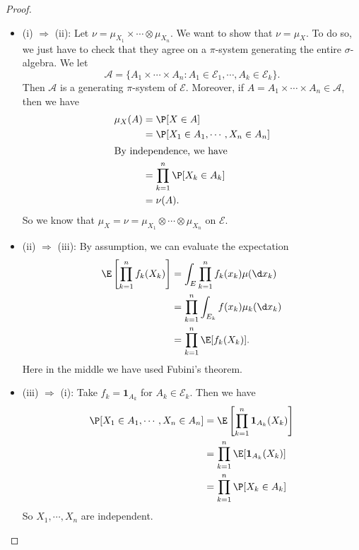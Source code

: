 \documentclass[a4paper]{article}
\begin{document}
\begin{proof}\leavevmode
  \begin{itemize}
    \item (i) $\Rightarrow$ (ii): Let $\nu = \mu_{X_1} \times \cdots \otimes \mu_{X_n}$. We want to show that $\nu = \mu_X$. To do so, we just have to check that they agree on a $\pi$-system generating the entire $\sigma$-algebra. We let
      \[
        \mathcal{A} = \{A_1 \times \cdots \times A_n: A_1 \in \mathcal{E}_1, \cdots, A_k \in \mathcal{E}_k\}.
      \]
      Then $\mathcal{A}$ is a generating $\pi$-system of $\mathcal{E}$. Moreover, if $A = A_1 \times \cdots \times A_n \in \mathcal{A}$, then we have
      \begin{align*}
        \mu_X(A) &= \P[X \in A] \\
        &= \P[X_1 \in A_1, \cdots, X_n \in A_n]\\
        \intertext{By independence, we have}
        &= \prod_{k = 1}^n \P[X_k \in A_k]\\
        &= \nu(A).
      \end{align*}
      So we know that $\mu_X = \nu = \mu_{X_1} \otimes \cdots \otimes \mu_{X_n}$ on $\mathcal{E}$.
    \item (ii) $\Rightarrow$ (iii): By assumption, we can evaluate the expectation
      \begin{align*}
        \E\left[\prod_{k = 1}^n f_k(X_k)\right] &= \int_E \prod_{k = 1}^n f_k(x_k) \mu(\d x_k)\\
        &= \prod_{k = 1}^n \int_{E_k} f(x_k) \mu_k(\d x_k)\\
        &= \prod_{k = 1}^n \E[f_k(X_k)].
      \end{align*}
      Here in the middle we have used Fubini's theorem.
    \item (iii) $\Rightarrow$ (i): Take $f_k = \mathbf{1}_{A_k}$ for $A_k \in \mathcal{E}_k$. Then we have
      \begin{align*}
        \P[X_1 \in A_1, \cdots, X_n \in A_n] &= \E\left[\prod_{k = 1}^n \mathbf{1}_{A_k}(X_k)\right] \\
        &= \prod_{k = 1}^n \E[\mathbf{1}_{A_k}(X_k)]\\
        &= \prod_{k = 1}^n \P[X_k \in A_k]
      \end{align*}
      So $X_1, \cdots, X_n$ are independent.\qedhere
  \end{itemize}
\end{proof}
\end{document}
